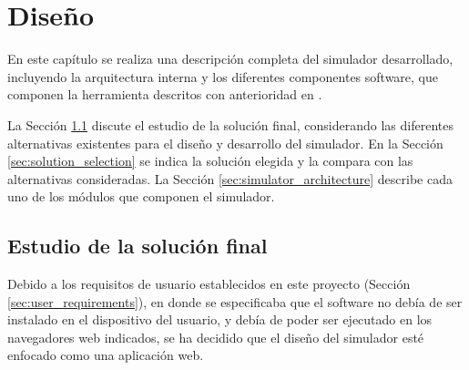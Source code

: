 \chead[]{}
\renewcommand{\headrulewidth}{0.5pt}

\lfoot[]{}
\cfoot[]{}
\rfoot[]{}
\renewcommand{\footrulewidth}{0pt}

\chapter{Diseño}
\label{ch:design}

En este capítulo se realiza una descripción completa del simulador desarrollado, incluyendo la arquitectura interna y los diferentes componentes software, que componen la herramienta descritos con anterioridad en \cite{mateos2016wepsim}.

La Sección \ref{sec:study_of_solution} discute el estudio de la solución final, considerando las diferentes alternativas existentes para el diseño y desarrollo del simulador. En la Sección \ref{sec:solution_selection} se indica la solución elegida y la compara con las alternativas consideradas. La Sección \ref{sec:simulator_architecture} describe cada uno de los módulos que componen el simulador.

\section{Estudio de la solución final}
\label{sec:study_of_solution}

Debido a los requisitos de usuario establecidos en este proyecto (Sección \ref{sec:user_requirements}), en donde se especificaba que el software no debía de ser instalado en el dispositivo del usuario, y debía de poder ser ejecutado en los navegadores web indicados, se ha decidido que el diseño del simulador esté enfocado como una aplicación web.

